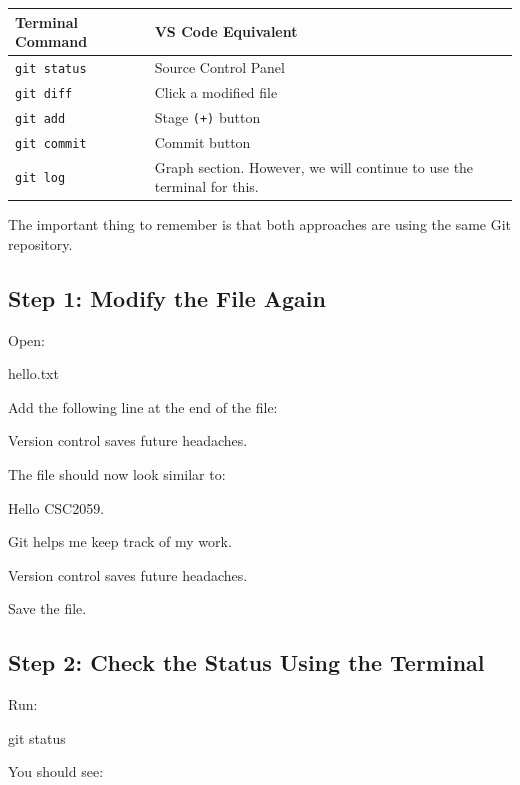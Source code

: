 \documentclass{csc2059practical}
\begin{document}
\begin{center}
\begin{tabularx}{\textwidth}{@{} l X @{}}
\toprule
\textbf{Terminal Command} & \textbf{VS Code Equivalent} \\
\midrule
\texttt{git status} & Source Control Panel \\
\texttt{git diff} & Click a modified file \\
\texttt{git add} & Stage \texttt{(+)} button \\
\texttt{git commit} & Commit button \\
\texttt{git log} & Graph section. However, we will continue to use the terminal for this. \\
\bottomrule
\end{tabularx}
\end{center}

The important thing to remember is that both approaches are using the same Git repository.

\subsection{Step 1: Modify the File Again}
Open:

\begin{terminalplain}
hello.txt
\end{terminalplain}
Add the following line at the end of the file:

\begin{terminalplain}
Version control saves future headaches.
\end{terminalplain}
The file should now look similar to:

\begin{terminalplain}
Hello CSC2059.
\end{terminalplain}
Git helps me keep track of my work.

\begin{terminalplain}
Version control saves future headaches.
\end{terminalplain}
Save the file.

\subsection{Step 2: Check the Status Using the Terminal}
Run:

\begin{terminalplain}
git status
\end{terminalplain}
You should see:
\end{document}
